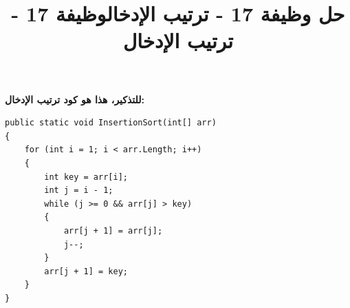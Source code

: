 \documentclass[14pt]{extarticle}
\title{حل وظيفة 17 - ترتيب الإدخال}
\title{وظيفة 17 - ترتيب الإدخال}
\begin{document}
\maketitle
\thispagestyle{fancy}

\textbf{للتذكير، هذا هو كود ترتيب الإدخال:}
\begin{english}
\begin{boxCode}
\begin{verbatim}
public static void InsertionSort(int[] arr)
{
    for (int i = 1; i < arr.Length; i++)
    {
        int key = arr[i];
        int j = i - 1;
        while (j >= 0 && arr[j] > key)
        {
            arr[j + 1] = arr[j];
            j--;
        }
        arr[j + 1] = key;
    }
}
\end{verbatim}
\end{boxCode}
\end{english}

\clearpage
\end{document}
